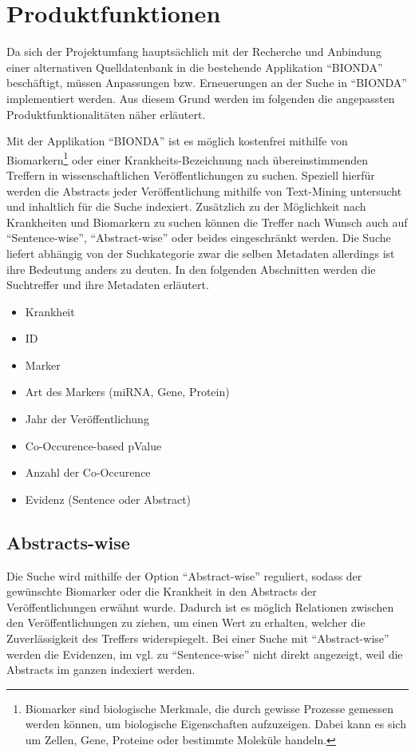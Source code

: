 \chapter*{Produktfunktionen}
Da sich der Projektumfang hauptsächlich mit der Recherche und Anbindung einer alternativen Quelldatenbank in die bestehende Applikation \enquote{BIONDA} beschäftigt, müssen Anpassungen bzw. Erneuerungen an der Suche in \enquote{BIONDA} implementiert werden. Aus diesem Grund werden im folgenden die angepassten Produktfunktionalitäten näher erläutert. 

Mit der Applikation \enquote{BIONDA} ist es möglich kostenfrei mithilfe von Biomarkern\footnote{Biomarker sind biologische Merkmale, die durch gewisse Prozesse gemessen werden können, um biologische Eigenschaften aufzuzeigen. Dabei kann es sich um Zellen, Gene, Proteine oder bestimmte Moleküle handeln.} oder einer Krankheits-Bezeichnung nach übereinstimmenden Treffern in wissenschaftlichen Veröffentlichungen zu suchen. Speziell hierfür werden die Abstracts jeder Veröffentlichung mithilfe von Text-Mining untersucht und inhaltlich für die Suche indexiert. Zusätzlich zu der Möglichkeit nach Krankheiten und Biomarkern zu suchen können die Treffer nach Wunsch auch auf \enquote{Sentence-wise}, \enquote{Abstract-wise} oder beides eingeschränkt werden. Die Suche liefert abhängig von der Suchkategorie zwar die selben Metadaten allerdings ist ihre Bedeutung anders zu deuten. In den folgenden Abschnitten werden die Suchtreffer und ihre Metadaten erläutert.

\begin{itemize}
\item{Krankheit} 
\item{ID} 
\item{Marker} 
\item{Art des Markers (miRNA, Gene, Protein)}
\item{Jahr der Veröffentlichung}
\item{Co-Occurence-based pValue} 
\item{Anzahl der Co-Occurence} 
\item{Evidenz (Sentence oder Abstract)} 
\end{itemize}

\section*{Abstracts-wise}
Die Suche wird mithilfe der Option \enquote{Abstract-wise} reguliert, sodass der gewünschte Biomarker oder die Krankheit in den Abstracts der Veröffentlichungen erwähnt wurde. Dadurch ist es möglich Relationen zwischen den Veröffentlichungen zu ziehen, um einen Wert zu erhalten, welcher die Zuverlässigkeit des Treffers widerspiegelt. Bei einer Suche mit \enquote{Abstract-wise} werden die Evidenzen, im vgl. zu \enquote{Sentence-wise} nicht direkt angezeigt, weil die Abstracts im ganzen indexiert werden.

